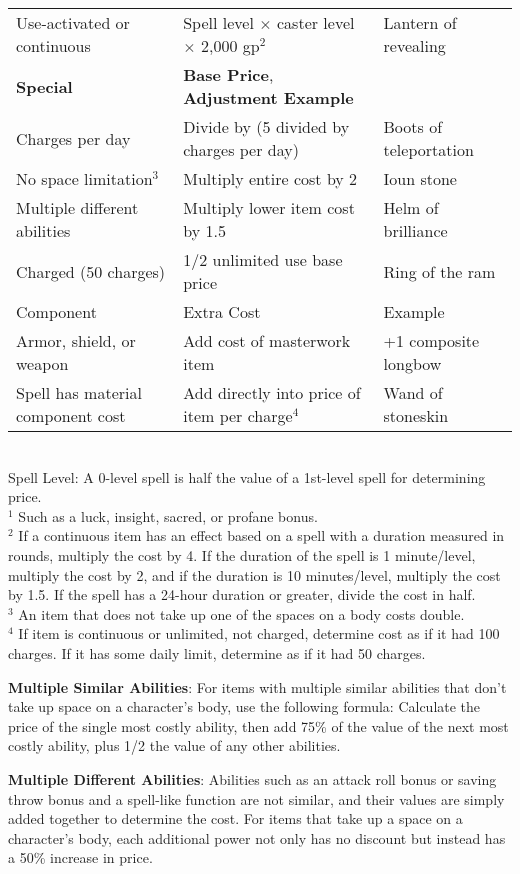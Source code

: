 \begin{table*}[]
\begin{tabular}{lll}
 Use-activated or continuous & Spell level $\times$ caster level $\times$ 2,000 gp\(^{2}\) & Lantern of revealing\\
\textbf{Special} & \textbf{Base Price}, \textbf{Adjustment Example}\\
Charges per day & Divide by (5 divided by charges per day) & Boots of teleportation \\
 No space limitation\(^{3}\) & Multiply entire cost by 2 & Ioun stone \\
 Multiple different abilities & Multiply lower item cost by 1.5  & Helm of brilliance \\
 Charged (50 charges) & 1/2 unlimited use base price & Ring of the ram\\
Component & Extra Cost & Example\\
Armor, shield, or weapon & Add cost of masterwork item & +1 composite longbow \\
 Spell has material component cost & Add directly into price of item per charge\(^{4}\) & Wand of stoneskin\\
 \end{tabular}\\
Spell Level: A 0-level spell is half the value of a 1st-level spell for determining price.\\
\(^{1}\) Such as a luck, insight, sacred, or profane bonus.\\
\(^{2}\) If a continuous item has an effect based on a spell with a duration measured in rounds, multiply the cost by 4. If the duration of the spell is 1 minute/level, multiply the cost by 2, and if the duration is 10 minutes/level, multiply the cost by 1.5. If the spell has a 24-hour duration or greater, divide the cost in half.\\
\(^{3}\) An item that does not take up one of the spaces on a body costs double.\\
\(^{4}\) If item is continuous or unlimited, not charged, determine cost as if it had 100 charges. If it has some daily limit, determine as if it had 50 charges.\\
\end{table*}
		
\textbf{Multiple Similar Abilities}: For items with multiple similar abilities that don't take up space on a character's body, use the following formula: Calculate the price of the single most costly ability, then add 75\% of the value of the next most costly ability, plus 1/2 the value of any other abilities.
				
\textbf{Multiple Different Abilities}: Abilities such as an attack roll bonus or saving throw bonus and a spell-like function are not similar, and their values are simply added together to determine the cost. For items that take up a space on a character's body, each additional power not only has no discount but instead has a 50\% increase in price.
				
